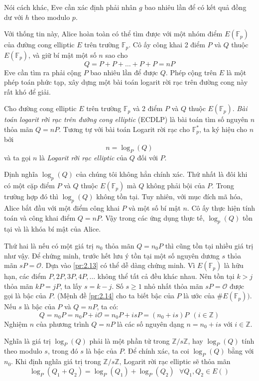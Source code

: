 Nói cách khác, Eve cần xác định phải nhân $g$ bao nhiêu lần để có kết quả đồng dư với $h$ theo modulo $p$.

Với thống tin này, Alice hoàn toàn có thể tìm được với một nhóm điểm $E(\mathbb{F}_p)$ của đường cong elliptic $E$ trên trường $\mathbb{F}_p$.
Cô ấy công khai 2 điểm $P$ và $Q$ thuộc $E(\mathbb{F}_p)$, và giữ bí mật một số $n$ sao cho
$$ Q = P+P+ \ldots +P+P = nP$$
Eve cần tìm ra phải cộng $P$ bao nhiêu lần để được $Q$. Phép cộng trên $E$ là một phép toán phức tạp, xây dựng một bài toán logarit rời rạc trên đường cong này rất khó để giải.

\begin{definition}
	Cho đường cong elliptic $E$ trên trường $\mathbb{F}_p$ và 2 điểm $P$ và $Q$ thuộc $E(\mathbb{F}_p)$. \textit{Bài toán logarit rời rạc trên đường cong elliptic} (ECDLP) là bài toán tìm số nguyên $n$ thỏa mãn $Q=nP$.
	Tương tự với bài toán Logarit rời rạc cho $\mathbb{F}^*_p$, ta ký hiệu cho $n$ bởi
	$$  n = \log_P(Q)$$
	và ta gọi $n$ là \textit{Logarit rời rạc elliptic} của $Q$ đối với $P$.
\end{definition}

\begin{remark}
	Định nghĩa $\log_p(Q)$ của chúng tôi không hẳn chính xác. Thứ nhất là đôi khi có một cặp điểm $P$ và $Q$ thuộc $E(\mathbb{F}_p)$ mà $Q$ không phải bội của $P$.
	Trong trường hợp đó thì $\log_p(Q)$  không tồn tại. Tuy nhiên, với mục đích mã hóa, Alice bắt đầu với một điểm công khai $P$ và một số bí mật $n$. Cô ấy thực hiện tính toán và công khai điểm $Q = nP$.
	Vậy trong các ứng dụng thực tế, $\log_p(Q)$ tồn tại và là khóa bí mật của Alice.

	Thứ hai là nếu có một giá trị $n_0$ thỏa mãn $Q=n_0P$ thì cũng tồn tại nhiều giá trị như vậy. Để chứng minh, trước hết lưu ý tồn tại một số nguyên dương $s$ thỏa mãn $sP = \mathcal{O}$. Dựa vào \ref{pr:2.13} có thể dễ dàng chứng minh.
	Vì $E(\mathbb{F}_p)$ là hữu hạn, các điểm $P, 2P, 3P, 4P, \ldots$ không thể tất cả đều khác nhau. Nên tồn tại $k > j$ thỏa mãn $kP = jP$, ta lấy $s = k-j$.
	Số $s \geq 1$ nhỏ nhất thỏa mãn $sP = \mathcal{O}$ được gọi là bậc của $P$. (Mệnh đề \ref{pr:2.14} cho ta biết bậc của $P$ là ước của $\#E(\mathbb{F}_p))$.
	Nếu $s$ là bậc của $P$ và $Q = nP$, ta có:
	$$ Q = n_0P = n_0P + i\mathcal{O} = n_0P + isP = (n_0+is)P \ \  (i\in \mathbb{Z})$$
	Nghiệm $n$ của phương trình $Q = nP$ là các số nguyên dạng $ n = n_0+is$ với $i\in \mathbb{Z}.$

	Nghĩa là giá trị $\log_P(Q)$ phải là một phần tử trong $\mathbb{Z}/s\mathbb{Z}$, hay $\log_P(Q)$ tính theo modulo $s$, trong đó $s$ là bậc của $P$.
	Để chính xác, ta coi $\log_P(Q)$ bằng với $n_0$. Khi định nghĩa giá trị trong $\mathbb{Z}/s\mathbb{Z}$, Logarit rời rạc elliptic sẽ thỏa mãn
	$$ \log_P(Q_1 + Q_2) = \log_P(Q_1) + \log_P(Q_2) \ \ \ \forall Q_1, Q_2 \in E()$$
\end{remark}

